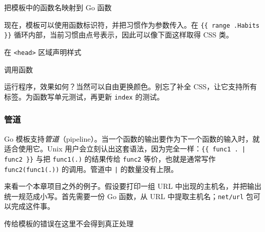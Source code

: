 \begin{codeannotations}
\item 把模板中的函数名映射到 Go 函数
\end{codeannotations}

现在，模板可以使用函数标识符，并把习惯作为参数传入。在 \texttt{\{\{ range .Habits \}\}} 循环内部，当前习惯由点号表示，因此可以像下面这样取得 CSS 类。


\begin{codeannotations}
\item 在 \texttt{<head>} 区域声明样式
\item 调用函数
\end{codeannotations}

运行程序，效果如何？当然可以自由更换颜色。别忘了补全 CSS，让它支持所有标签。为函数写单元测试，再更新 \texttt{index} 的测试。

\subsubsection{管道}

Go 模板支持\emph{管道}（pipeline）。当一个函数的输出要作为下一个函数的输入时，就适合使用它。Unix 用户会立刻认出这套语法，因为完全一样：\texttt{\{\{ func1 . | func2 \}\}} 与把 \texttt{func1(.)} 的结果传给 \texttt{func2} 等价，也就是通常写作 \texttt{func2(func1(.))} 的调用。管道中 \texttt{|} 的数量没有上限。

来看一个本章项目之外的例子。假设要打印一组 URL 中出现的主机名，并把输出统一规范成小写。首先需要一份 Go 函数，从 URL 中提取主机名；\texttt{net/url} 包可以完成这件事。


\begin{codeannotations}
\item 传给模板的错误在这里不会得到真正处理
\end{codeannotations}

